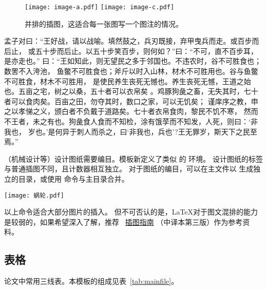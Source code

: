 \begin{figure}[htbp]
	\centering
	{\texttt{[image: image-a.pdf]}}
	\hspace{1cm}
	{\texttt{[image: image-c.pdf]}}
	\caption{并排的插图，这适合每一张图写一个图注的情况。}\label{fig:abreast-image-a-c}
\end{figure}

孟子对曰：“王好战，请以战喻。填然鼓之，兵刃既接，弃甲曳兵而走。或百步而后止，
或五十步而后止。以五十步笑百步，则何如？”曰：“不可，直不百步耳，是亦走也。”
曰：“王如知此，则无望民之多于邻国也。不违农时，谷不可胜食也；数罟不入洿池，
鱼鳖不可胜食也；斧斤以时入山林，材木不可胜用也。谷与鱼鳖不可胜食，材木不可胜用，
是使民养生丧死无憾也。养生丧死无憾，王道之始也。五亩之宅，树之以桑，五十者可以衣帛矣
。鸡豚狗彘之畜，无失其时，七十者可以食肉矣。百亩之田，勿夺其时，数口之家，可以无饥矣；
谨庠序之教，申之以孝悌之义，颁白者不负戴于道路矣。七十者衣帛食肉，黎民不饥不寒，
然而不王者，未之有也。狗彘食人食而不知检，涂有饿莩而不知发，人死，则曰：‘非我也，
岁也。’是何异于刺人而杀之，曰‘非我也，兵也’?王无罪岁，斯天下之民至焉。”

（机械设计等）设计图纸需要编目。模板新定义了类似  的 环境。
设计图纸的标签与普通插图不同，且计数器相互独立。
对于图纸的编目，可以在主文件以  生成独立的目录，或使用
命令与主目录合并。
\begin{dfigure}%
	\centering
	\texttt{[image: 蜗轮.pdf]}
	\caption{设计图纸示例}  %
\end{dfigure}

以上命令适合大部分图片的插入。
但不可否认的是，\LaTeX{}对于图文混排的能力是较弱的，如果希望深入了解，推荐~
\href{https://github.com/WenboSheng/epslatex-cn}{\LaTeXe 插图指南}
（中译本第三版）作为参考资料。


\subsection{表格}\label{subsec:tab}
论文中常用三线表。本模板的组成见表~\ref{tab:mainfile}。

